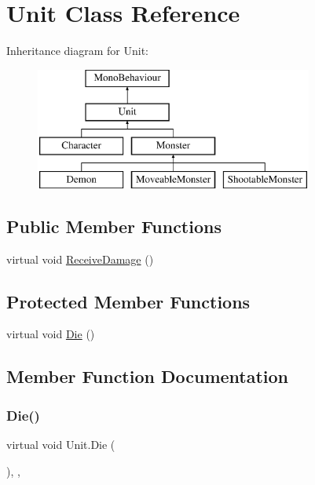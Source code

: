 \hypertarget{class_unit}{}\section{Unit Class Reference}
\label{class_unit}
Inheritance diagram for Unit\+:\begin{figure}[H]
\begin{center}
\leavevmode
\includegraphics[height=4.000000cm]{class_unit}
\end{center}
\end{figure}
\subsection*{Public Member Functions}
\begin{DoxyCompactItemize}
\item 
virtual void \mbox{\hyperlink{class_unit_a698a459fd5eeef7fc906f4657b723fa4}{Receive\+Damage}} ()
\end{DoxyCompactItemize}
\subsection*{Protected Member Functions}
\begin{DoxyCompactItemize}
\item 
virtual void \mbox{\hyperlink{class_unit_af3d22541d2829f0de065bf6aecee9957}{Die}} ()
\end{DoxyCompactItemize}


\subsection{Member Function Documentation}
\mbox{\label{class_unit_af3d22541d2829f0de065bf6aecee9957}} 
\subsubsection{\texorpdfstring{Die()}{Die()}}
{\footnotesize\ttfamily virtual void Unit.\+Die (\begin{DoxyParamCaption}{ }\end{DoxyParamCaption})\hspace{0.3cm}{\ttfamily [inline]}, {\ttfamily [protected]}, {\ttfamily [virtual]}}

